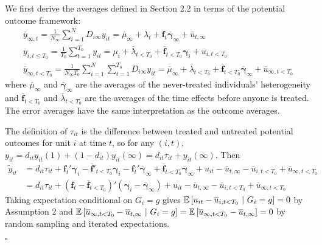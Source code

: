 \documentclass[12pt]{article}
\begin{document}
We first derive the averages defined in Section 2.2 in terms of the potential outcome framework:
\begin{gather*}
    \overline{y}_{\infty , t} = \frac{1}{N_{\infty}} \sum_{i = 1}^N D_{i \infty} y_{it} = \overline{\mu}_{\infty} + \lambda_t + \bm f_t \overline{\bm \gamma}_{\infty} + \overline{u}_{t, \infty}\\
    \overline{y}_{i,t\leq T_0} = \frac{1}{T_0} \sum_{t = 1}^{T_0} y_{it} = \mu_i + \overline{\lambda}_{t < T_0} + \overline{\bm f}_{t < T_0} \bm \gamma_i + \overline{u}_{i,t < T_0}\\
    \overline{y}_{\infty, t < T_0} = \frac{1}{N_{\infty} T_0} \sum_{i = 1}^N \sum_{t = 1}^{T_0} D_{i \infty} y_{it} = \overline{\mu}_{\infty} + \overline{\lambda}_{t < T_0} + \overline{\bm f}_{t < T_0} \overline{\bm \gamma}_{\infty} + \overline{u}_{\infty, t < T_0}
\end{gather*}
where $\overline{\mu}_{\infty}$ and $\overline{\bm \gamma}_{\infty}$ are the averages of the never-treated individuals' heterogeneity and $\overline{\bm f}_{t < T_0}$ and $\overline{\lambda}_{t < T_0}$ are the averages of the time effects before anyone is treated. The error averages have the same interpretation as the outcome averages.

The definition of $\tau_{it}$ is the difference between treated and untreated potential outcomes for unit $i$ at time $t$, so for any $(i,t)$, $y_{it} = d_{it} y_{it}(1) + (1-d_{it})y_{it}(\infty) = d_{it} \tau_{it} + y_{it}(\infty)$. Then
\begin{align*}
    \tilde{y}_{it} 
    &= d_{it} \tau_{it} + \bm f_t' \bm \gamma_i - \overline{\bm f}'_{t < T_0} \bm \gamma_i - \bm f_t' \overline{\bm \gamma}_{\infty} + \overline{\bm f}_{t < T_0} \overline{\bm \gamma}_{\infty} + u_{it} - \overline{u}_{t,\infty} - \overline{u}_{i, t < T_0} + \overline{u}_{\infty, t < T_0}\\
    &= d_{it} \tau_{it} + (\bm f_t - \overline{\bm f}_{t < T_0})' (\bm \gamma_i - \overline{\bm \gamma}_{\infty}) + u_{it} - \overline{u}_{t,\infty} - \overline{u}_{i, t < T_0} + \overline{u}_{\infty, t < T_0}
\end{align*}
Taking expectation conditional on $G_i = g$ gives $\mathbb{E}\left[u_{it} - \overline{u}_{i, t < T_0} \ \vert \ G_i = g\right] = 0$ by Assumption 2 and $\mathbb{E}\left[\overline{u}_{\infty, t < T_0} - \overline{u}_{t, \infty}  \ \vert \ G_i = g\right] = \mathbb{E}\left[\overline{u}_{\infty, t < T_0} - \overline{u}_{t, \infty}\right] = 0$ by random sampling and iterated expectations.

$\square$
\end{document}
